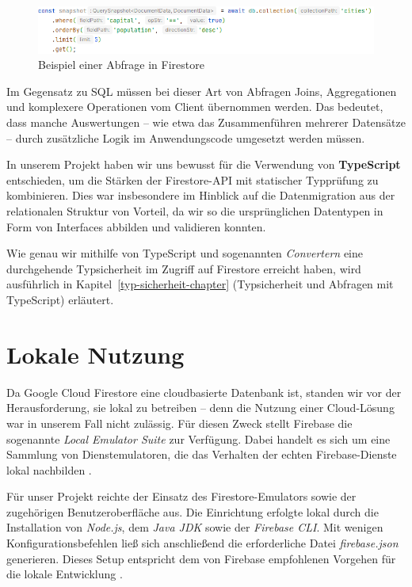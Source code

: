 \documentclass[12pt,a4paper%
              ,oneside     %
              ,titlepage
              ,DIV=13
              ,headinclude
              ,footinclude=false%
              ,cleardoublepage=empty%
              ,parskip=half,
              BCOR=0mm,
              ]{scrreprt}
\begin{document}
\begin{figure}[H]
	\centering
	\includegraphics[width=\linewidth]{img/code_example_0.png}
	\caption{Beispiel einer Abfrage in Firestore}
	\label{fig:code-example-0}
\end{figure}

Im Gegensatz zu SQL müssen bei dieser Art von Abfragen Joins, Aggregationen und komplexere Operationen vom Client übernommen werden. Das bedeutet, dass manche Auswertungen – wie etwa das Zusammenführen mehrerer Datensätze – durch zusätzliche Logik im Anwendungscode umgesetzt werden müssen.

In unserem Projekt haben wir uns bewusst für die Verwendung von \textbf{TypeScript} entschieden, um die Stärken der Firestore-API mit statischer Typprüfung zu kombinieren. Dies war insbesondere im Hinblick auf die Datenmigration aus der relationalen Struktur von Vorteil, da wir so die ursprünglichen Datentypen in Form von Interfaces abbilden und validieren konnten.

Wie genau wir mithilfe von TypeScript und sogenannten \textit{Convertern} eine durchgehende Typsicherheit im Zugriff auf Firestore erreicht haben, wird ausführlich in Kapitel~\ref{typ-sicherheit-chapter} (\glqq Typsicherheit und Abfragen mit TypeScript\grqq{}) erläutert.

\section{Lokale Nutzung}

Da Google Cloud Firestore eine cloudbasierte Datenbank ist, standen wir vor der Herausforderung, sie lokal zu betreiben – denn die Nutzung einer Cloud-Lösung war in unserem Fall nicht zulässig. Für diesen Zweck stellt Firebase die sogenannte \textit{Local Emulator Suite} zur Verfügung. Dabei handelt es sich um eine Sammlung von Dienstemulatoren, die das Verhalten der echten Firebase-Dienste lokal nachbilden \cite{EmulatorSuite.2025}.

Für unser Projekt reichte der Einsatz des Firestore-Emulators sowie der zugehörigen Benutzeroberfläche aus. Die Einrichtung erfolgte lokal durch die Installation von \textit{Node.js}, dem \textit{Java JDK} sowie der \textit{Firebase CLI}. Mit wenigen Konfigurationsbefehlen ließ sich anschließend die erforderliche Datei \textit{firebase.json} generieren. Dieses Setup entspricht dem von Firebase empfohlenen Vorgehen für die lokale Entwicklung \cite{EmulatorInsall.2025}.
\end{document}
